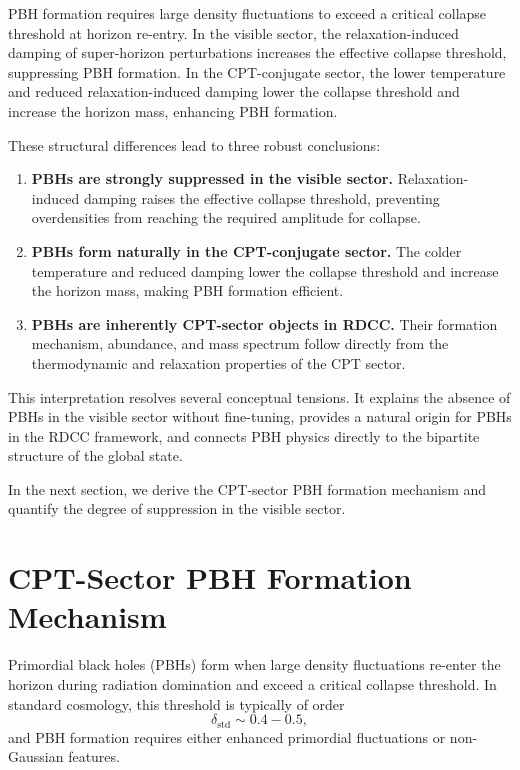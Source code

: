 \documentclass[11pt,a4paper]{article}
\begin{document}
PBH formation requires large density fluctuations to exceed a critical collapse threshold at
horizon re-entry. In the visible sector, the relaxation-induced damping of super-horizon
perturbations increases the effective collapse threshold, suppressing PBH formation. In the
CPT-conjugate sector, the lower temperature and reduced relaxation-induced damping lower the
collapse threshold and increase the horizon mass, enhancing PBH formation.

These structural differences lead to three robust conclusions:

\begin{enumerate}[label=(\alph*)]
\item \textbf{PBHs are strongly suppressed in the visible sector.}  
Relaxation-induced damping raises the effective collapse threshold, preventing overdensities
from reaching the required amplitude for collapse.

\item \textbf{PBHs form naturally in the CPT-conjugate sector.}  
The colder temperature and reduced damping lower the collapse threshold and increase the
horizon mass, making PBH formation efficient.

\item \textbf{PBHs are inherently CPT-sector objects in RDCC.}  
Their formation mechanism, abundance, and mass spectrum follow directly from the
thermodynamic and relaxation properties of the CPT sector.
\end{enumerate}

This interpretation resolves several conceptual tensions. It explains the absence of PBHs in the
visible sector without fine-tuning, provides a natural origin for PBHs in the RDCC framework,
and connects PBH physics directly to the bipartite structure of the global state.

In the next section, we derive the CPT-sector PBH formation mechanism and quantify the
degree of suppression in the visible sector.


\section{CPT-Sector PBH Formation Mechanism}

Primordial black holes (PBHs) form when large density fluctuations re-enter the horizon during
radiation domination and exceed a critical collapse threshold. In standard cosmology, this
threshold is typically of order
\begin{equation}
\delta_{\mathrm{std}} \sim 0.4 - 0.5,
\end{equation}
and PBH formation requires either enhanced primordial fluctuations or non-Gaussian features.
\end{document}
